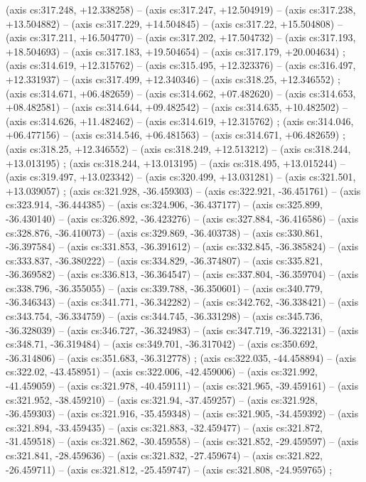     (axis cs:317.248,    +12.338258) --  (axis cs:317.247,    +12.504919) --  (axis cs:317.238,    +13.504882) --  (axis cs:317.229,    +14.504845) --  (axis cs:317.22,    +15.504808) --  (axis cs:317.211,    +16.504770) --  (axis cs:317.202,    +17.504732) --  (axis cs:317.193,    +18.504693) --  (axis cs:317.183,    +19.504654) --  (axis cs:317.179,    +20.004634) ;
    (axis cs:314.619,    +12.315762) --  (axis cs:315.495,    +12.323376) --  (axis cs:316.497,    +12.331937) --  (axis cs:317.499,    +12.340346) --  (axis cs:318.25,    +12.346552) ;
    (axis cs:314.671,    +06.482659) --  (axis cs:314.662,    +07.482620) --  (axis cs:314.653,    +08.482581) --  (axis cs:314.644,    +09.482542) --  (axis cs:314.635,    +10.482502) --  (axis cs:314.626,    +11.482462) --  (axis cs:314.619,    +12.315762) ;
    (axis cs:314.046,    +06.477156) --  (axis cs:314.546,    +06.481563) --  (axis cs:314.671,    +06.482659) ;
    (axis cs:318.25,    +12.346552) --  (axis cs:318.249,    +12.513212) --  (axis cs:318.244,    +13.013195) ;
    (axis cs:318.244,    +13.013195) --  (axis cs:318.495,    +13.015244) --  (axis cs:319.497,    +13.023342) --  (axis cs:320.499,    +13.031281) --  (axis cs:321.501,    +13.039057) ;
    (axis cs:321.928,    -36.459303) --  (axis cs:322.921,    -36.451761) --  (axis cs:323.914,    -36.444385) --  (axis cs:324.906,    -36.437177) --  (axis cs:325.899,    -36.430140) --  (axis cs:326.892,    -36.423276) --  (axis cs:327.884,    -36.416586) --  (axis cs:328.876,    -36.410073) --  (axis cs:329.869,    -36.403738) --  (axis cs:330.861,    -36.397584) --  (axis cs:331.853,    -36.391612) --  (axis cs:332.845,    -36.385824) --  (axis cs:333.837,    -36.380222) --  (axis cs:334.829,    -36.374807) --  (axis cs:335.821,    -36.369582) --  (axis cs:336.813,    -36.364547) --  (axis cs:337.804,    -36.359704) --  (axis cs:338.796,    -36.355055) --  (axis cs:339.788,    -36.350601) --  (axis cs:340.779,    -36.346343) --  (axis cs:341.771,    -36.342282) --  (axis cs:342.762,    -36.338421) --  (axis cs:343.754,    -36.334759) --  (axis cs:344.745,    -36.331298) --  (axis cs:345.736,    -36.328039) --  (axis cs:346.727,    -36.324983) --  (axis cs:347.719,    -36.322131) --  (axis cs:348.71,    -36.319484) --  (axis cs:349.701,    -36.317042) --  (axis cs:350.692,    -36.314806) --  (axis cs:351.683,    -36.312778) ;
    (axis cs:322.035,    -44.458894) --  (axis cs:322.02,    -43.458951) --  (axis cs:322.006,    -42.459006) --  (axis cs:321.992,    -41.459059) --  (axis cs:321.978,    -40.459111) --  (axis cs:321.965,    -39.459161) --  (axis cs:321.952,    -38.459210) --  (axis cs:321.94,    -37.459257) --  (axis cs:321.928,    -36.459303) --  (axis cs:321.916,    -35.459348) --  (axis cs:321.905,    -34.459392) --  (axis cs:321.894,    -33.459435) --  (axis cs:321.883,    -32.459477) --  (axis cs:321.872,    -31.459518) --  (axis cs:321.862,    -30.459558) --  (axis cs:321.852,    -29.459597) --  (axis cs:321.841,    -28.459636) --  (axis cs:321.832,    -27.459674) --  (axis cs:321.822,    -26.459711) --  (axis cs:321.812,    -25.459747) --  (axis cs:321.808,    -24.959765) ;

